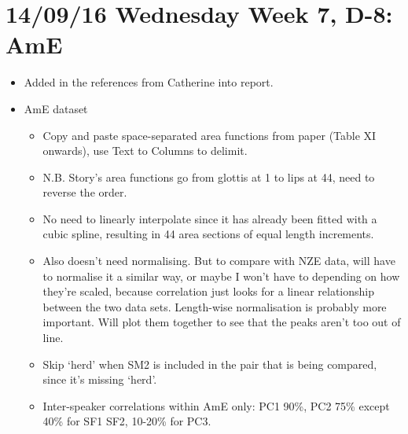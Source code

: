 \documentclass{article}
\begin{document}
\section*{14/09/16 Wednesday Week 7, D-8: AmE}
\begin{itemize} 
    \item Added in the references from Catherine into report.
    \item AmE dataset
    \begin{itemize}
        \item Copy and paste space-separated area functions from paper (Table XI onwards), use Text to Columns to delimit.
        \item N.B. Story's area functions go from glottis at 1 to lips at 44, need to reverse the order.
        \item No need to linearly interpolate since it has already been fitted with a cubic spline, resulting in 44 area sections of equal length increments.
        \item Also doesn't need normalising. But to compare with NZE data, will have to normalise it a similar way, or maybe I won't have to depending on how they're scaled, because correlation just looks for a linear relationship between the two data sets. Length-wise normalisation is probably more important. Will plot them together to see that the peaks aren't too out of line.
        \item Skip `herd' when SM2 is included in the pair that is being compared, since it's missing `herd'.
        \item Inter-speaker correlations within AmE only: PC1 90\%, PC2 75\% except 40\% for SF1 SF2, 10-20\% for PC3.
    \end{itemize}
\end{itemize}
\end{document}
